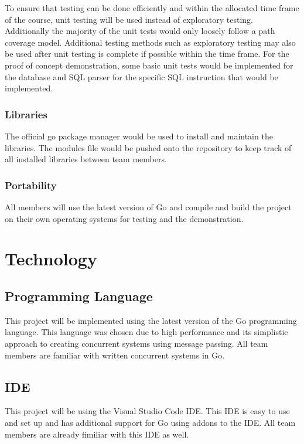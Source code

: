 \documentclass[12pt,letterpaper]{article}
\begin{document}
To ensure that testing can be done efficiently and within the allocated time frame of the course, unit testing will be used instead of exploratory testing. Additionally the majority of the unit tests would only loosely follow a path coverage model. Additional testing methods such as exploratory testing may also be used after unit testing is complete if possible within the time frame. For the proof of concept demonstration, some basic unit tests would be implemented for the database and SQL parser for the specific SQL instruction that would be implemented.

\subsubsection{Libraries}

The official go package manager would be used to install and maintain the libraries. The modules file would be pushed onto the repository to keep track of all installed libraries between team members.

\subsubsection{Portability}

All members will use the latest version of Go and compile and build the project on their own operating systems for testing and the demonstration.

\section{Technology}

\subsection{Programming Language}

This project will be implemented using the latest version of the Go programming language. This language was chosen due to high performance and its simplistic approach to creating concurrent systems using message passing. All team members are familiar with written concurrent systems in Go.

\subsection{IDE}

This project will be using the Visual Studio Code IDE. This IDE is easy to use and set up and has additional support for Go using addons to the IDE. All team members are already fimiliar with this IDE as well.
\end{document}
